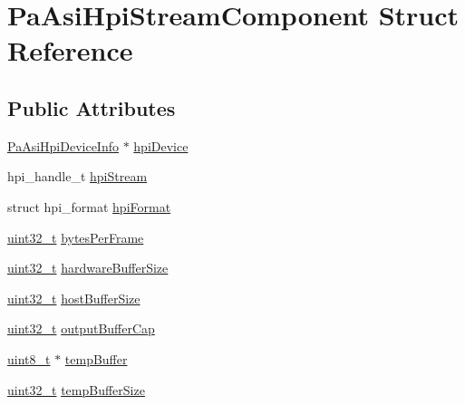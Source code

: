 \hypertarget{struct_pa_asi_hpi_stream_component}{}\section{Pa\+Asi\+Hpi\+Stream\+Component Struct Reference}
\label{struct_pa_asi_hpi_stream_component}
\subsection*{Public Attributes}
\begin{DoxyCompactItemize}
\item 
\hyperlink{struct_pa_asi_hpi_device_info}{Pa\+Asi\+Hpi\+Device\+Info} $\ast$ \hyperlink{struct_pa_asi_hpi_stream_component_a1c84299c224c375c465b4e75bfce17f4}{hpi\+Device}
\item 
hpi\+\_\+handle\+\_\+t \hyperlink{struct_pa_asi_hpi_stream_component_adb013f749ef39f2757a89ac73ec4d1fd}{hpi\+Stream}
\item 
struct hpi\+\_\+format \hyperlink{struct_pa_asi_hpi_stream_component_a7728064372425eaee08c70bbe936b891}{hpi\+Format}
\item 
\hyperlink{lib-src_2ffmpeg_2win32_2stdint_8h_a6eb1e68cc391dd753bc8ce896dbb8315}{uint32\+\_\+t} \hyperlink{struct_pa_asi_hpi_stream_component_afa3f30d67315cd9fd127f4141d087dc0}{bytes\+Per\+Frame}
\item 
\hyperlink{lib-src_2ffmpeg_2win32_2stdint_8h_a6eb1e68cc391dd753bc8ce896dbb8315}{uint32\+\_\+t} \hyperlink{struct_pa_asi_hpi_stream_component_aaee8d45f2dd21ee33afeb9a8efda119e}{hardware\+Buffer\+Size}
\item 
\hyperlink{lib-src_2ffmpeg_2win32_2stdint_8h_a6eb1e68cc391dd753bc8ce896dbb8315}{uint32\+\_\+t} \hyperlink{struct_pa_asi_hpi_stream_component_a2e74e02676b12b73cec01f0d4b3a9d32}{host\+Buffer\+Size}
\item 
\hyperlink{lib-src_2ffmpeg_2win32_2stdint_8h_a6eb1e68cc391dd753bc8ce896dbb8315}{uint32\+\_\+t} \hyperlink{struct_pa_asi_hpi_stream_component_aee16a4bcc8580a966c64bbac57c0611c}{output\+Buffer\+Cap}
\item 
\hyperlink{lib-src_2ffmpeg_2win32_2stdint_8h_a9a941819355e6f658991890ff66b4b0e}{uint8\+\_\+t} $\ast$ \hyperlink{struct_pa_asi_hpi_stream_component_a2a6fb26a57106d7c62f63578d38437b9}{temp\+Buffer}
\item 
\hyperlink{lib-src_2ffmpeg_2win32_2stdint_8h_a6eb1e68cc391dd753bc8ce896dbb8315}{uint32\+\_\+t} \hyperlink{struct_pa_asi_hpi_stream_component_a7b8eeeb20693a1f1deb0b41c2800c6a7}{temp\+Buffer\+Size}
\end{DoxyCompactItemize}


